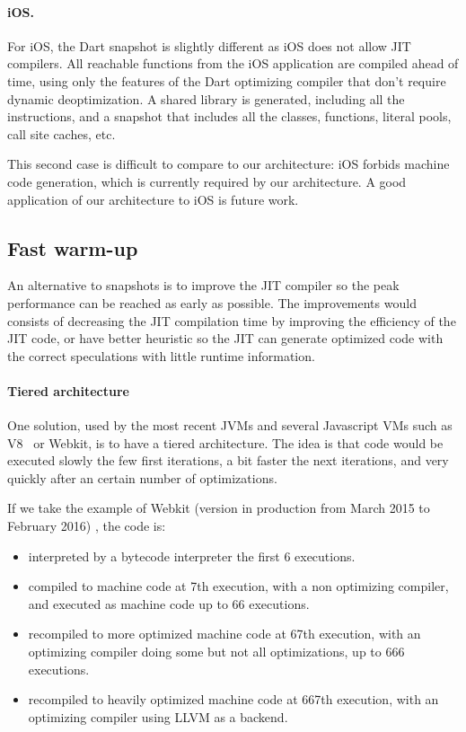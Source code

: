 \documentclass[a4paper,12pt,twoside]{../includes/ThesisStyle}
\begin{document}
\paragraph{iOS.} For iOS, the Dart snapshot is slightly different as iOS does not allow JIT compilers. All reachable functions from the iOS application are compiled ahead of time, using only the features of the Dart optimizing compiler that don't require dynamic deoptimization. A shared library is generated, including all the instructions, and a snapshot that includes all the classes, functions, literal pools, call site caches, etc.

This second case is difficult to compare to our architecture: iOS forbids machine code generation, which is currently required by our architecture. A good application of our architecture to iOS is future work.

\subsection{Fast warm-up}

An alternative to snapshots is to improve the JIT compiler so the peak performance can be reached as early as possible. The improvements would consists of decreasing the JIT compilation time by improving the efficiency of the JIT code, or have better heuristic so the JIT can generate optimized code with the correct speculations with little runtime information.

\paragraph{Tiered architecture}
One solution, used by the most recent JVMs and several Javascript VMs such as V8~\cite{V8} or Webkit, is to have a tiered architecture. The idea is that code would be executed slowly the few first iterations, a bit faster the next iterations, and very quickly after an certain number of optimizations. 

If we take the example of Webkit (version in production from March 2015 to February 2016) \cite{Webkit15}, the code is:
\begin{itemize}
\item interpreted by a bytecode interpreter the first 6 executions.
\item compiled to machine code at 7th execution, with a non optimizing compiler, and executed as machine code up to 66 executions.
\item recompiled to more optimized machine code at 67th execution, with an optimizing compiler doing some but not all optimizations, up to 666 executions.
\item recompiled to heavily optimized machine code at 667th execution, with an optimizing compiler using LLVM as a backend.
\end{itemize}
\end{document}

